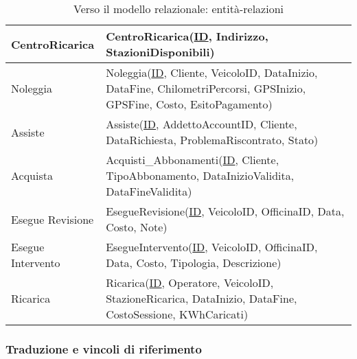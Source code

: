 \documentclass{article}
\begin{document}
\begin{table}[H]
\begin{tabularx}{\textwidth}{|p{3.1cm}|X|}
        CentroRicarica & CentroRicarica(\underline{ID}, Indirizzo, StazioniDisponibili) \\ \hline
        Noleggia & Noleggia(\underline{ID}, Cliente, VeicoloID, DataInizio, DataFine, ChilometriPercorsi, GPSInizio, GPSFine, Costo, EsitoPagamento)\\ \hline
        Assiste & Assiste(\underline{ID}, AddettoAccountID, Cliente, DataRichiesta, ProblemaRiscontrato, Stato)\\ \hline
        Acquista & Acquisti\_Abbonamenti(\underline{ID}, Cliente, TipoAbbonamento, DataInizioValidita, DataFineValidita) \\ \hline
        Esegue Revisione & EsegueRevisione(\underline{ID}, VeicoloID, OfficinaID, Data, Costo, Note) \\ \hline
        Esegue Intervento & EsegueIntervento(\underline{ID}, VeicoloID, OfficinaID, Data, Costo, Tipologia, Descrizione)\\ \hline
        Ricarica & Ricarica(\underline{ID}, Operatore, VeicoloID, StazioneRicarica, DataInizio, DataFine, CostoSessione, KWhCaricati) \\ \hline
    \end{tabularx}
    \caption{Verso il modello relazionale: entità-relazioni}
    \label{tab:entità-relazioni}
\end{table}


\subsubsection{Traduzione e vincoli di riferimento}
\end{document}
